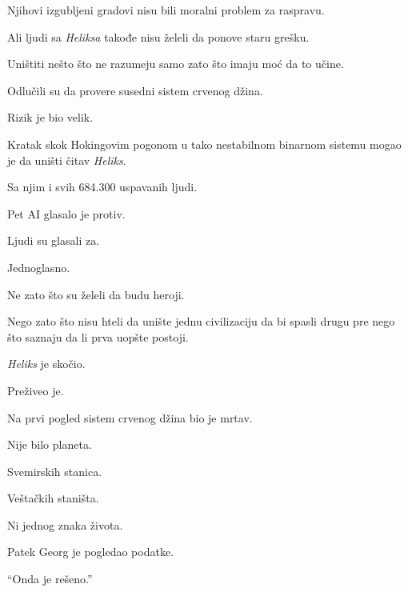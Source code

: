 Njihovi izgubljeni gradovi nisu bili moralni problem za raspravu.

\bigskip

Ali ljudi sa \emph{Heliksa} takođe nisu želeli da ponove staru grešku.

\bigskip

Uništiti nešto što ne razumeju samo zato što imaju moć da to učine.

\bigskip

Odlučili su da provere susedni sistem crvenog džina.

\bigskip

Rizik je bio velik.

\bigskip

Kratak skok Hokingovim pogonom u tako nestabilnom binarnom sistemu mogao je da uništi čitav \emph{Heliks}.

\bigskip

Sa njim i svih 684.300 uspavanih ljudi.

\bigskip

Pet AI glasalo je protiv.

\bigskip

Ljudi su glasali za.

\bigskip

Jednoglasno.

\bigskip

Ne zato što su želeli da budu heroji.

\bigskip

Nego zato što nisu hteli da unište jednu civilizaciju da bi spasli drugu pre nego što saznaju da li prva uopšte postoji.

\bigskip

\emph{Heliks} je skočio.

\bigskip

Preživeo je.

\bigskip

Na prvi pogled sistem crvenog džina bio je mrtav.

\bigskip

Nije bilo planeta.

Svemirskih stanica.

Veštačkih staništa.

\bigskip

Ni jednog znaka života.

\bigskip

Patek Georg je pogledao podatke.

``Onda je rešeno.''

\bigskip

